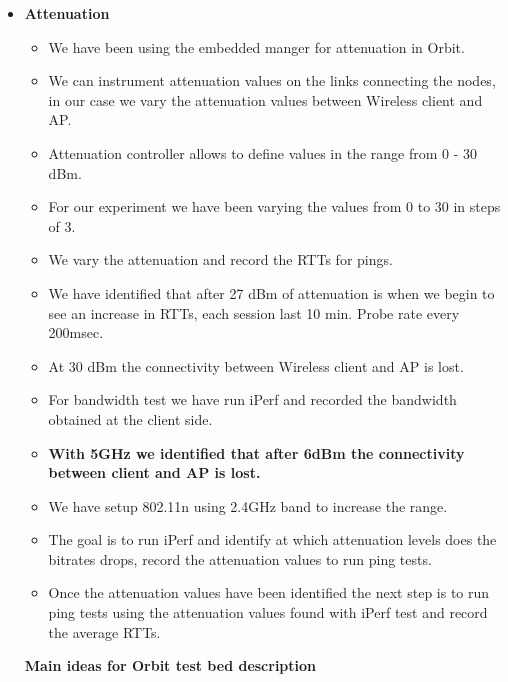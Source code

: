 \begin{itemize}
	\item \textbf{Attenuation}
	\begin{itemize}
		\item We have been using the embedded manger for attenuation in Orbit.
		\item We can instrument attenuation values on the links connecting the nodes, in our case we vary the attenuation values between Wireless client and AP.
		\item Attenuation controller allows to define values in the range from 0 - 30 dBm.
		\item For our experiment we have been varying the values from 0 to 30 in steps of 3.
		\item We vary the attenuation and record the RTTs for pings.
		\item We have identified that after 27 dBm of attenuation is when we begin to see an increase in RTTs, each session last 10 min. Probe rate every 200msec.
		\item At 30 dBm the connectivity between Wireless client and AP is lost.
		\item For bandwidth test we have run iPerf and recorded the bandwidth obtained at the client side.
		\item \textbf{With 5GHz we identified that after 6dBm the connectivity between client and AP is lost.}
		\item We have setup 802.11n using 2.4GHz band to increase the range.
		\item The goal is to run iPerf and identify at which attenuation levels does the bitrates drops, record the attenuation values to run ping tests.
		\item Once the attenuation values have been identified the next step is to run ping tests using the attenuation values found with iPerf test and record the average RTTs.
		
	\end{itemize}


\textbf{Main ideas for Orbit test bed description}


\end{itemize}
